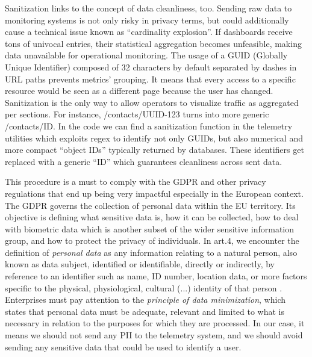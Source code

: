 \documentclass[12pt,a4paper,openright,twoside]{book}
\begin{document}
Sanitization links to the concept of data cleanliness, too. Sending raw data to monitoring systems is not only risky in privacy terms, but could additionally cause a technical issue known as ``cardinality explosion''. If dashboards receive tons of univocal entries, their statistical aggregation becomes unfeasible, making data unavailable for operational monitoring. The usage of a GUID (Globally Unique Identifier) composed of 32 characters by default separated by dashes in URL paths prevents metrics' grouping. It means that every access to a specific resource would be seen as a different page because the user has changed. Sanitization is the only way to allow operators to visualize traffic as aggregated per sections. For instance, /contacts/UUID-123 turns into more generic /contacts/ID. In the code we can find a sanitization function in the telemetry utilities which exploits regex to identify not only GUIDs, but also numerical and more compact ``object IDs'' typically returned by databases. These identifiers get replaced with a generic ``ID'' which guarantees cleanliness across sent data.

This procedure is a must to comply with the \ac{GDPR} and other privacy regulations that end up being very impactful especially in the European context. 
The GDPR governs the collection of personal data within the EU territory. Its objective is defining what sensitive data is, how it can be collected, how to deal with biometric data which is another subset of the wider sensitive information group, and how to protect the privacy of individuals. 
In art.4, we encounter the definition of \textit{personal data} as any information relating to a natural person, also known as data subject, identified or identifiable, directly or indirectly, by reference to an identifier such as name, ID number, location data, or more factors specific to the physical, physiological, cultural (...) identity of that person \cite{GDPR}. 
Enterprises must pay attention to the \textit{principle of data minimization}, which states that personal data must be adequate, relevant and limited to what is necessary in relation to the purposes for which they are processed. In our case, it means we should not send any PII to the telemetry system, and we should avoid sending any sensitive data that could be used to identify a user. 
\end{document}
